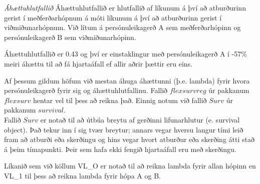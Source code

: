 \documentclass[
]{book}
\newenvironment{Shaded}{\begin{snugshade}}{\end{snugshade}}
\newcommand{\DecValTok}[1]{\textcolor[rgb]{0.00,0.00,0.81}{#1}}
\newcommand{\NormalTok}[1]{#1}
\newcommand{\OperatorTok}[1]{\textcolor[rgb]{0.81,0.36,0.00}{\textbf{#1}}}
\newcommand{\StringTok}[1]{\textcolor[rgb]{0.31,0.60,0.02}{#1}}
\begin{document}
\emph{Áhættuhlutfallið}
Áhættuhlutfallið er hlutfallið af líkunum á því að atburðurinn gerist í meðferðarhópnum á móti líkunum á því að atburðurinn gerist í viðmiðunarhópnum. Við lítum á persónuleikagerð A sem meðferðarhópinn og persónuleikagerð B sem viðmiðunarhópinn.

\begin{Shaded}
\end{Shaded}

Áhættuhlutfallið er 0.43 og því er einstaklingur með persónuleikagerð A í -57\% meiri áhættu til að fá hjartaáfall ef allir aðrir þættir eru eins.

Af þessum gildum höfum við mestan áhuga áhættunni (þ.e. lambda) fyrir hvora persónuleikagerð fyrir sig og áhættuhlutfallinu. Fallið \(flexsurvreg\) úr pakkanum \(flexsurv\) hentar vel til þess að reikna það. Einnig notum við fallið \(Surv\) úr pakkanum \(survival\).\\
Fallið \(Surv\) er notað til að útbúa breytu af gerðinni lifunarhlutur (e. survival object). Það tekur inn í sig tvær breytur; annars vegar hversu langur tími leið fram að atburði eða skerðingu og hins vegar hvort atburður eða skerðing átti stað á þeim tímapunkti. Þeir sem hafa ekki fengið hjartaáfall eru með skerðingu.

Líkanið sem við köllum VL\_O er notað til að reikna lambda fyrir allan hópinn en VL\_1 til þess að reikna lambda fyrir hópa A og B.
\end{document}
